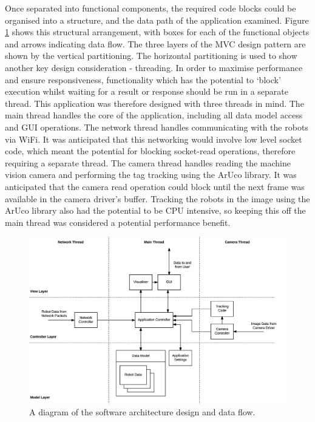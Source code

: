 Once separated into functional components, the required code blocks could be organised into a structure, and the data path of the application examined. Figure \ref{fig:SoftwareArchitecture} shows this structural arrangement, with boxes for each of the functional objects and arrows indicating data flow. The three layers of the MVC design pattern are shown by the vertical partitioning. The horizontal partitioning is used to show another key design consideration - threading. In order to maximise performance and ensure responsiveness, functionality which has the potential to `block' execution whilst waiting for a result or response should be run in a separate thread. This application was therefore designed with three threads in mind. The main thread handles the core of the application, including all data model access and GUI operations. The network thread handles communicating with the robots via WiFi. It was anticipated that this networking would involve low level socket code, which meant the potential for blocking socket-read operations, therefore requiring a separate thread. The camera thread handles reading the machine vision camera and performing the tag tracking using the ArUco library. It was anticipated that the camera read operation could block until the next frame was available in the camera driver's buffer. Tracking the robots in the image using the ArUco library also had the potential to be CPU intensive, so keeping this off the main thread was considered a potential performance benefit.

\begin{figure}
	\centering
	\includegraphics[scale=0.7]{Figures/SoftwareArchitecture.png}
	\decoRule
	\caption[Software Architecture Diagram]{A diagram of the software architecture design and data flow.}
	\label{fig:SoftwareArchitecture}
\end{figure}

